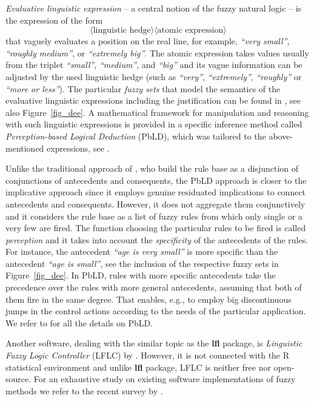 \documentclass[review]{elsarticle}
\newcommand{\pkg}[1]{\textbf{#1}}
\newcommand{\proglang}[1]{#1}
\newcommand{\R}{\proglang{R}}
\begin{document}
\emph{Evaluative linguistic expression} -- a central notion of the fuzzy natural logic -- is the expression of the form
%
$$\langle \textrm{linguistic hedge}\rangle \langle \textrm{atomic expression}\rangle$$
%
that vaguely evaluates a position on the real line, for example, \emph{``very small''}, \emph{``roughly medium''}, or \emph{``extremely big''}. The atomic expression takes values usually from the triplet 
\emph{``small''}, \emph{``medium''}, and \emph{``big''} and its vague information can be adjusted by the used linguistic hedge (such as \emph{``very''}, \emph{``extremely''}, \emph{``roughly''} or \emph{``more or less''}).
The particular \emph{fuzzy sets} that model the semantics of the evaluative linguistic expressions including the justification can be found in \cite{Novak08}, see also Figure~\ref{fig_dee}. A mathematical framework for manipulation and reasoning with
such linguistic expressions is provided in a specific inference method called  \emph{Perception-based
Logical Deduction} (PbLD), which was tailored to the above-mentioned expressions, see \cite{Dvovrak2004formal,Novak:PbLD, Dvorak_etal:RedundancyFSS}.



Unlike the traditional approach of \cite{MamdaniAssilian75}, who build the
rule base as a disjunction of conjunctions of antecedents and consequents, the PbLD approach is
closer to the implicative approach \citep{Jones2009, Step_etal_continuity} since it employs genuine residuated implications to connect antecedents and consequents. However, it does not aggregate them conjunctively and it considers the rule base as a list of fuzzy rules from which only single or a very few are fired. The function choosing the particular rules to be fired is called \emph{perception} and it takes into account the  \emph{specificity} of the antecedents of the rules.
For instance, the antecedent \emph{``age is very small''} is more specific than the antecedent \emph{``age is small''}, see the inclusion of the respective fuzzy sets in Figure~\ref{fig_dee}. 
In PbLD, rules with more specific antecedents take the precedence over the rules with more general antecedents, assuming that both of them fire in the same degree. That enables, e.g., to employ big discontinuous jumps in the control actions according to the needs of the particular
application. We refer to \cite{Novak:PbLD,DvoStep:PbLD2015} for all the details on PbLD.



Another software, dealing with the
similar topic as the \pkg{lfl} package, is \emph{Linguistic Fuzzy Logic Controller} (LFLC) by \cite{dvo:lflc}.
However, it is not connected with the \R{} statistical environment and unlike \pkg{lfl} package, LFLC is neither free nor open-source. For an exhaustive study on existing software implementations of fuzzy methods we refer to the recent survey by \cite{AlcalAlonso:fuzzySW_IEEETFS16}.
\end{document}

